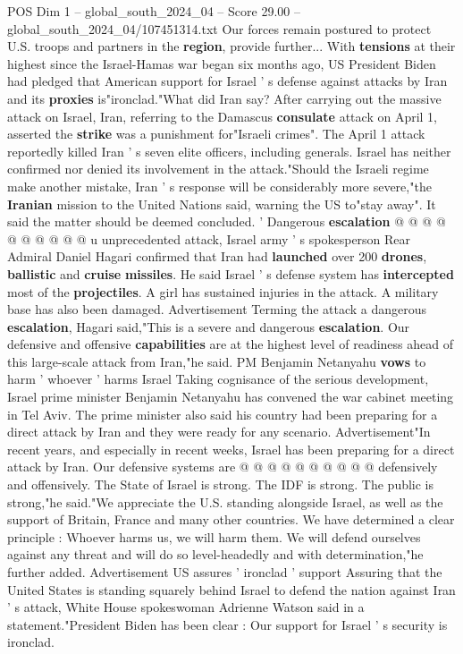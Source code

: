 \begin{textsample}{POS Dim 1 – global\_south\_2024\_04 – Score 29.00 – global\_south\_2024\_04/107451314.txt}
Our forces remain postured to protect U.S. troops and partners in the \textbf{region}, provide further...
With \textbf{tensions} at their highest since the Israel-Hamas war began six months ago, US President Biden had pledged that American support for Israel ' s defense against attacks by Iran and its \textbf{proxies} is"ironclad."What did Iran say?
After carrying out the massive attack on Israel, Iran, referring to the Damascus \textbf{consulate} attack on April 1, asserted the \textbf{strike} was a punishment for"Israeli crimes".
The April 1 attack reportedly killed Iran ' s seven elite officers, including generals.
Israel has neither confirmed nor denied its involvement in the attack."Should the Israeli regime make another mistake, Iran ' s response will be considerably more severe,"the \textbf{Iranian} mission to the United Nations said, warning the US to"stay away".
It said the matter should be deemed concluded. ' Dangerous \textbf{escalation} @ @ @ @ @ @ @ @ @ @ u unprecedented attack, Israel army ' s spokesperson Rear Admiral Daniel Hagari confirmed that Iran had \textbf{launched} over 200 \textbf{drones}, \textbf{ballistic} and \textbf{cruise} \textbf{missiles}.
He said Israel ' s defense system has \textbf{intercepted} most of the \textbf{projectiles}.
A girl has sustained injuries in the attack.
A military base has also been damaged.
Advertisement Terming the attack a dangerous \textbf{escalation}, Hagari said,"This is a severe and dangerous \textbf{escalation}.
Our defensive and offensive \textbf{capabilities} are at the highest level of readiness ahead of this large-scale attack from Iran,"he said.
PM Benjamin Netanyahu \textbf{vows} to harm ' whoever ' harms Israel Taking cognisance of the serious development, Israel prime minister Benjamin Netanyahu has convened the war cabinet meeting in Tel Aviv.
The prime minister also said his country had been preparing for a direct attack by Iran and they were ready for any scenario.
Advertisement"In recent years, and especially in recent weeks, Israel has been preparing for a direct attack by Iran.
Our defensive systems are @ @ @ @ @ @ @ @ @ @ defensively and offensively.
The State of Israel is strong.
The IDF is strong.
The public is strong,"he said."We appreciate the U.S. standing alongside Israel, as well as the support of Britain, France and many other countries.
We have determined a clear principle : Whoever harms us, we will harm them.
We will defend ourselves against any threat and will do so level-headedly and with determination,"he further added.
Advertisement US assures ' ironclad ' support Assuring that the United States is standing squarely behind Israel to defend the nation against Iran ' s attack, White House spokeswoman Adrienne Watson said in a statement."President Biden has been clear : Our support for Israel ' s security is ironclad.

\end{textsample}
